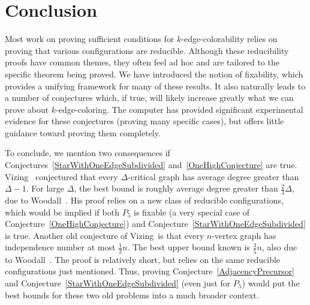 \documentclass[12pt]{article}
\theoremstyle{plain}
\theoremstyle{definition}
\theoremstyle{remark}
\begin{document}
\section{Conclusion}
Most work on proving sufficient conditions for $k$-edge-colorability relies on
proving that various configurations are reducible.  Although these reducibility
proofs have common themes, they often feel ad hoc and are tailored to the
specific theorem being proved.  We have introduced the notion of fixability,
which provides a unifying framework for many of these results.  It also
naturally leads to a number of conjectures which, if true, will likely increase 
greatly what we can prove about $k$-edge-coloring.  The computer has provided
significant experimental evidence for these conjectures (proving many specific
cases), but offers little guidance toward proving them completely.

To conclude, we mention two consequences if
Conjectures~\ref{StarWithOneEdgeSubdivided} and~\ref{OneHighConjecture}
are true.
Vizing~\cite{vizing68unsolved} conjectured that every $\Delta$-critical graph
has average degree
greater than $\Delta-1$.  For large $\Delta$, the best bound is roughly average
degree greater than $\frac23\Delta$, due to Woodall~\cite{woodall2007average}. 
His proof relies on a new class of reducible configurations, which would be
implied if both $P_5$ is fixable (a very special case of
Conjecture~\ref{OneHighConjecture}) and
Conjecture~\ref{StarWithOneEdgeSubdivided} is true.  Another old conjecture of
Vizing~\cite{vizing65chromatic}is that every $n$-vertex graph has independence
number at most $\frac12n$.  The best upper bound known is $\frac35n$,
also due to Woodall~\cite{woodall2011independence}.  The proof is relatively
short, but relies on the same reducible configurations just mentioned.  Thus, proving
Conjecture~\ref{AdjacencyPrecursor} and
Conjecture~\ref{StarWithOneEdgeSubdivided} (even just for $P_5$) would put the
best bounds for these two old problems into a much broader context.


\end{document}
